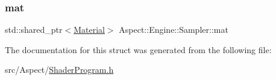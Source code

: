 \mbox{\label{struct_aspect_1_1_engine_1_1_sampler_acab2c584b4973154fe061a8398867de4}} 
\subsubsection{\texorpdfstring{mat}{mat}}
{\footnotesize\ttfamily std\+::shared\+\_\+ptr$<$\mbox{\hyperlink{class_aspect_1_1_engine_1_1_material}{Material}}$>$ Aspect\+::\+Engine\+::\+Sampler\+::mat}



The documentation for this struct was generated from the following file\+:\begin{DoxyCompactItemize}
\item 
src/\+Aspect/\mbox{\hyperlink{_shader_program_8h}{Shader\+Program.\+h}}\end{DoxyCompactItemize}
